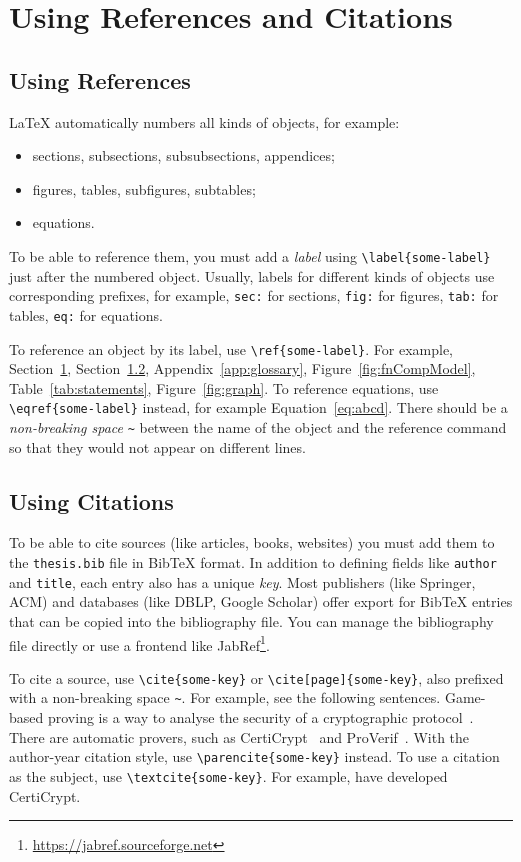\section{Using References and Citations}
\label{sec:refs-cites}

\subsection{Using References}
LaTeX automatically numbers all kinds of objects, for example:
\begin{itemize}
    \item sections, subsections, subsubsections, appendices;
    \item figures, tables, subfigures, subtables;
    \item equations.
\end{itemize}
To be able to reference them, you must add a \emph{label} using \verb|\label{some-label}| just after the numbered object.
Usually, labels for different kinds of objects use corresponding prefixes, for example, \verb|sec:| for sections, \verb|fig:| for figures, \verb|tab:| for tables, \verb|eq:| for equations.

To reference an object by its label, use \verb|\ref{some-label}|.
For example, Section~\ref{sec:refs-cites}, Section~\ref{sec:cites}, Appendix~\ref{app:glossary}, Figure~\ref{fig:fnCompModel}, Table~\ref{tab:statements}, Figure~\ref{fig:graph}.
To reference equations, use \verb|\eqref{some-label}| instead, for example Equation~\eqref{eq:abcd}.
There should be a \emph{non-breaking space} \verb|~| between the name of the object and the reference command so that they would not appear on different lines.


\subsection{Using Citations}
\label{sec:cites}

To be able to cite sources (like articles, books, websites) you must add them to the \verb|thesis.bib| file in BibTeX format.
In addition to defining fields like \verb|author| and \verb|title|, each entry also has a unique \emph{key}.
Most publishers (like Springer, ACM) and databases (like DBLP, Google Scholar) offer export for BibTeX entries that can be copied into the bibliography file.
You can manage the bibliography file directly or use a frontend like JabRef\footnote{\url{https://jabref.sourceforge.net}}.

To cite a source, use \verb|\cite{some-key}| or \verb|\cite[page]{some-key}|, also prefixed with a non-breaking space \verb|~|.
For example, see the following sentences.
Game-based proving is a way to analyse the security of a cryptographic protocol~\cite{GameB_1,GameB_2}.
There are automatic provers, such as CertiCrypt~\cite{certiCrypt} and ProVerif~\cite{proVerif}.
With the author-year citation style, use \verb|\parencite{some-key}| instead.
To use a citation as the subject, use \verb|\textcite{some-key}|.
For example, \textcite{certiCrypt} have developed CertiCrypt.

